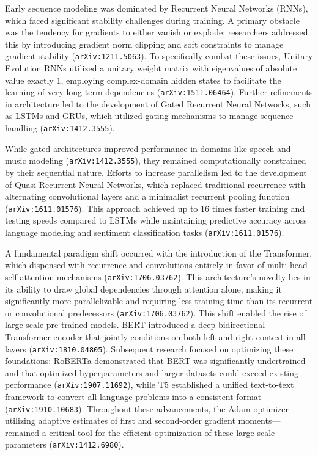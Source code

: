 \documentclass[11pt]{article}
\begin{document}
Early sequence modeling was dominated by Recurrent Neural Networks (RNNs), which faced significant stability challenges during training. A primary obstacle was the tendency for gradients to either vanish or explode; researchers addressed this by introducing gradient norm clipping and soft constraints to manage gradient stability (\texttt{arXiv:1211.5063}). To specifically combat these issues, Unitary Evolution RNNs utilized a unitary weight matrix with eigenvalues of absolute value exactly 1, employing complex-domain hidden states to facilitate the learning of very long-term dependencies (\texttt{arXiv:1511.06464}). Further refinements in architecture led to the development of Gated Recurrent Neural Networks, such as LSTMs and GRUs, which utilized gating mechanisms to manage sequence handling (\texttt{arXiv:1412.3555}).

While gated architectures improved performance in domains like speech and music modeling (\texttt{arXiv:1412.3555}), they remained computationally constrained by their sequential nature. Efforts to increase parallelism led to the development of Quasi-Recurrent Neural Networks, which replaced traditional recurrence with alternating convolutional layers and a minimalist recurrent pooling function (\texttt{arXiv:1611.01576}). This approach achieved up to 16 times faster training and testing speeds compared to LSTMs while maintaining predictive accuracy across language modeling and sentiment classification tasks (\texttt{arXiv:1611.01576}).

A fundamental paradigm shift occurred with the introduction of the Transformer, which dispensed with recurrence and convolutions entirely in favor of multi-head self-attention mechanisms (\texttt{arXiv:1706.03762}). This architecture's novelty lies in its ability to draw global dependencies through attention alone, making it significantly more parallelizable and requiring less training time than its recurrent or convolutional predecessors (\texttt{arXiv:1706.03762}). This shift enabled the rise of large-scale pre-trained models. BERT introduced a deep bidirectional Transformer encoder that jointly conditions on both left and right context in all layers (\texttt{arXiv:1810.04805}). Subsequent research focused on optimizing these foundations: RoBERTa demonstrated that BERT was significantly undertrained and that optimized hyperparameters and larger datasets could exceed existing performance (\texttt{arXiv:1907.11692}), while T5 established a unified text-to-text framework to convert all language problems into a consistent format (\texttt{arXiv:1910.10683}). Throughout these advancements, the Adam optimizer—utilizing adaptive estimates of first and second-order gradient moments—remained a critical tool for the efficient optimization of these large-scale parameters (\texttt{arXiv:1412.6980}).
\end{document}
